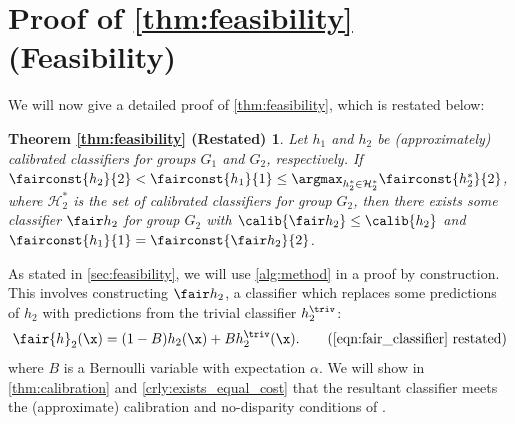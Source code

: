 \section{Proof of \autoref{thm:feasibility} (Feasibility)}
\label{sec:detailed-feasibility}

We will now give a detailed proof of \autoref{thm:feasibility}, which
is restated below:
%
\newtheorem*{thm:feasibility}{Theorem \ref{thm:feasibility} (Restated)}
\begin{thm:feasibility}
  Let $h_1$ and $h_2$ be (approximately) calibrated classifiers
  for groups $G_1$ and $G_2$, respectively. If $\fairconst{h_2}{2} < \fairconst{h_1}{1} \leq
  \argmax_{h^*_2 \in \mathcal{H}^*_2} \fairconst{h^*_2}{2}$, where
  $\mathcal{H}^*_2$ is the set of calibrated classifiers for group $G_2$,
  then there exists some classifier $\fair h_2$ for group $G_2$ with
  $\calib{\fair h_2} \leq \calib{h_2}$ and $\fairconst{h_1}{1} = \fairconst{\fair h_2}{2}$.
\end{thm:feasibility}
%
As stated in \autoref{sec:feasibility}, we will use \autoref{alg:method} in
a proof by construction.
This involves constructing $\fair h_2$, a classifier which replaces some predictions
of $h_2$ with predictions from the trivial classifier $h^\triv_2$:
%
\begin{equation*}
  \fair{h}_2(\x) = (1 - B) h_2(\x) + B h^\triv_2(\x).
  \tag{\ref{eqn:fair_classifier} restated}
\end{equation*}
%
where $B$ is a Bernoulli variable with expectation $\alpha$.
%
We will show in \autoref{thm:calibration} and \autoref{crly:exists_equal_cost}
that the resultant classifier meets the (approximate) calibration and no-disparity
conditions of \methodname{}.





